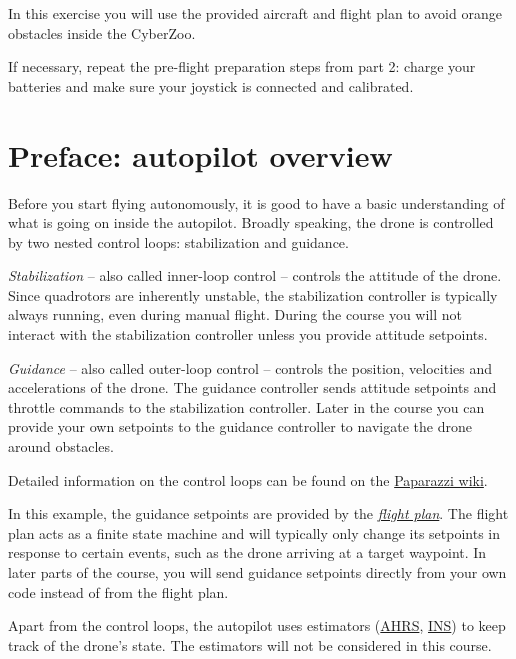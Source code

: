 \documentclass{article}
\begin{document}

In this exercise you will use the provided aircraft and flight plan to avoid orange obstacles inside the CyberZoo.

If necessary, repeat the pre-flight preparation steps from part 2: charge your batteries and make sure your joystick is connected and calibrated.


\section{Preface: autopilot overview}
Before you start flying autonomously, it is good to have a basic understanding of what is going on inside the autopilot. Broadly speaking, the drone is controlled by two nested control loops: stabilization and guidance.

\emph{Stabilization} -- also called inner-loop control -- controls the attitude of the drone. Since quadrotors are inherently unstable, the stabilization controller is typically always running, even during manual flight. During the course you will not interact with the stabilization controller unless you provide attitude setpoints.

\emph{Guidance} -- also called outer-loop control -- controls the position, velocities and accelerations of the drone. The guidance controller sends attitude setpoints and throttle commands to the stabilization controller. Later in the course you can provide your own setpoints to the guidance controller to navigate the drone around obstacles.

Detailed information on the control loops can be found on the \href{http://wiki.paparazziuav.org/wiki/Control_Loops#Rotorcraft_autopilot}{Paparazzi wiki}.

In this example, the guidance setpoints are provided by the \href{https://wiki.paparazziuav.org/wiki/Flight_Plans}{\emph{flight plan}}. The flight plan acts as a finite state machine and will typically only change its setpoints in response to certain events, such as the drone arriving at a target waypoint. In later parts of the course, you will send guidance setpoints directly from your own code instead of from the flight plan.

Apart from the control loops, the autopilot uses estimators (\href{http://wiki.paparazziuav.org/wiki/Subsystem/ahrs}{AHRS}, \href{http://wiki.paparazziuav.org/wiki/Subsystem/ins}{INS}) to keep track of the drone's state. The estimators will not be considered in this course.
\end{document}
